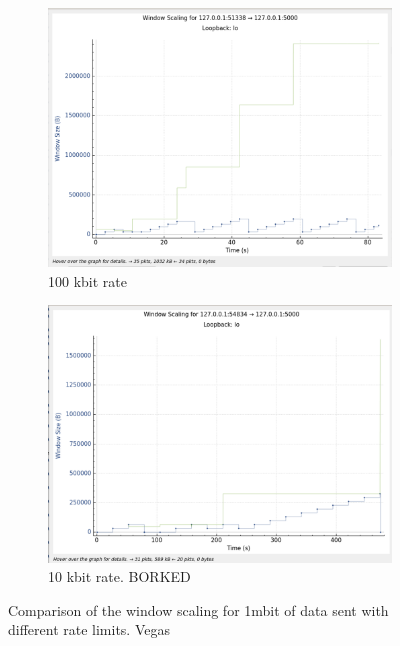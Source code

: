 \documentclass{report}
\begin{document}
\begin{figure}[H]
    \begin{subfigure}[b]{0.45\textwidth}
        \centering
        \includegraphics[width=\textwidth]{Pics/Vegas/r100kbit_s1m_ws}
        \caption{100 kbit rate}
    \end{subfigure}
    \hfill
    \begin{subfigure}[b]{0.45\textwidth}
        \centering
        \includegraphics[width=\textwidth]{Pics/Vegas/r10kbit_s1m_ws}
        \caption{10 kbit rate. BORKED}
    \end{subfigure}
    \caption{Comparison of the window scaling for 1mbit of data sent with different rate limits. Vegas}
    \label{fig:four_images}
\end{figure}
\end{document}
